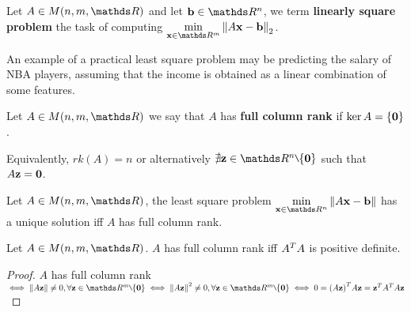 \documentclass[computationalMathematics.tex]{subfiles}
\begin{document}
\begin{definition}
  Let $A \in M(n, m, \R)$ and let $\vect{b} \in \R^n$, we term \textbf{linearly square problem} the task of computing $\min\limits_{\vect{x} \in \R^m} \norm{A\vect{x} - \vect{b}}_2$.
\end{definition}



An example of a practical least square problem may be predicting the salary of NBA players, assuming that the income is obtained as a linear combination of some features.

\begin{definition}
  Let $A \in M(n, m, \R)$ we say that $A$ has \textbf{full column rank} if $\ker{A} = \{{\bf 0 }\}$.

  Equivalently, $rk(A) = n$ or alternatively $\nexists \vect{z} \in \R^n \setminus \{\vect{0}\}$ such that $A{\bf z } = {\bf 0 }$.
\end{definition}

\begin{proposition}
  Let $A \in M(n, m, \R)$, the least square problem $\min\limits_{\vect{x} \in \R^n} \norm{A\vect{x} - \vect{b}}$ has a unique solution iff $A$ has full column rank.
\end{proposition}

\begin{theorem}
  Let $A \in M(n, m, \R)$. $A$ has full column rank iff ${A}^{T}A$ is positive definite.
\end{theorem}

\begin{proof}
  $A$ has full column rank $\iff \norm{A\vect{z}} \neq 0, \forall \vect{z} \in \R^m \setminus \{\vect{0}\}\iff \norm{A\vect{z}}^2 \neq 0, \forall \vect{z} \in \R^m \setminus \{\vect{0}\}\iff 0=\tr{(A\vect{z})} A\vect{z} = \tr{\vect{z}}\tr{A}A\vect{z}$  
\end{proof}
\end{document}
